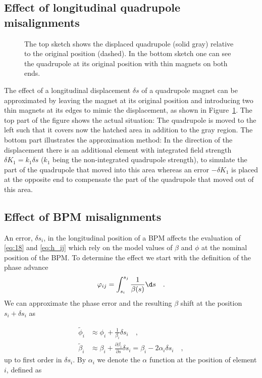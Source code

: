 \subsection{Effect of longitudinal quadrupole misalignments}

\begin{figure}
    \centering
    
	\caption{
        The top sketch shows the displaced quadrupole (solid gray) relative to the original position
        (dashed). In the bottom sketch one can see the quadrupole at its original position with thin
        magnets on both ends.
    }
	\label{fig:quadmisal}
\end{figure} 

The effect of a longitudinal displacement $ \delta s $ of a quadrupole magnet can be approximated by
leaving the magnet at its original position and introducing two thin magnets at its edges to mimic
the displacement, as shown in Figure~\ref{fig:quadmisal}.
The top part of the figure shows the actual situation:
The quadrupole is moved to the left such that it covers now the hatched area in addition to the gray
region. 
The bottom part illustrates the approximation method:
In the direction of the displacement there is an additional element with integrated field strength
$ \delta K_1 = k_1\delta s $ ($k_1$ being the 
non-integrated quadrupole strength), to simulate the part of the quadrupole that moved into this area
whereas an error 
$ -\delta K_1 $ is placed at the opposite end to compensate the part of the quadrupole that moved out
of this area.



\subsection{Effect of BPM misalignments}

An error, $ \delta s_i $, in the longitudinal position of
a BPM affects the evaluation of \eqref{eq:18} and \eqref{eq:h_ij} which rely on the model
values of $ \beta $ and $ \phi $ at the nominal position of the BPM. To determine the effect we start
with the definition of the phase advance
\begin{equation}
\phi_{ij} = \int_{s_i}^{s_j} \frac{1}{\beta(s)}\d s\quad .
\end{equation}
We can approximate the phase error and the resulting $\beta$ shift at the position $s_i + \delta s_i$ as

\begin{align}
\tilde{\phi}_i &\approx \phi_i + \frac{1}{\beta_i}\delta s_i\quad , 
\label{eq:Dphi} \\
\tilde{\beta}_i &\approx \beta_i + \frac{\partial \beta_i}{\partial s} \delta s_i  = \beta_i - 2\alpha_i \delta s_i \quad , \label{eq:Dbeta}
\end{align}
up to first order in $ \delta s_i $. By $ \alpha_i $ we denote the $ \alpha $ function at the position
of element $ i $, defined as 

